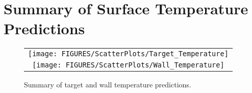 \clearpage

\section{Summary of Surface Temperature Predictions}


\begin{figure}[h!]
\begin{center}
\begin{tabular}{c}
\texttt{[image: FIGURES/ScatterPlots/Target\_Temperature]} \\
\texttt{[image: FIGURES/ScatterPlots/Wall\_Temperature]}
\end{tabular}
\end{center}
\caption[Summary of target and wall temperature predictions]
{Summary of target and wall temperature predictions.}
\end{figure}

